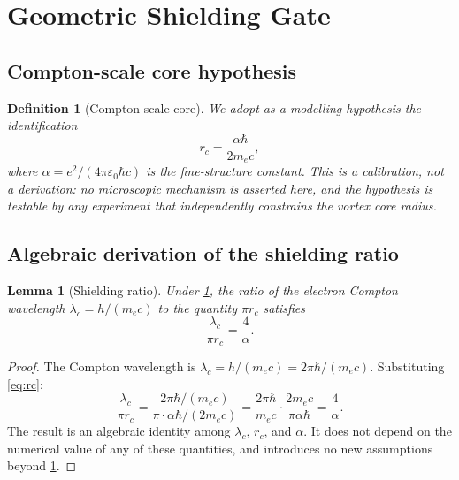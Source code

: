 \documentclass[11pt, a4paper]{article}
\newtheorem{definition}{Definition}
\newtheorem{lemma}{Lemma}
\newcommand{\rc}{r_c}        %
\newcommand{\lc}{\lambda_c}  %
\begin{document}
\section{Geometric Shielding Gate}
\label{sec:geometric}

\subsection{Compton-scale core hypothesis}
\label{sec:core_hypothesis}

\begin{definition}[Compton-scale core]
\label{def:core}
We adopt as a modelling hypothesis the identification
\begin{equation}
  \rc = \frac{\alpha\hbar}{2m_e c},
  \label{eq:rc}
\end{equation}
where $\alpha = e^2/(4\pi\varepsilon_0\hbar c)$ is the
fine-structure constant.
This is a \emph{calibration}, not a derivation: no microscopic
mechanism is asserted here, and the hypothesis is testable by
any experiment that independently constrains the vortex core
radius.
\end{definition}

\subsection{Algebraic derivation of the shielding ratio}
\label{sec:4alpha}

\begin{lemma}[Shielding ratio]
\label{lem:shield}
Under \cref{def:core}, the ratio of the electron Compton
wavelength $\lc = h/(m_e c)$ to the quantity $\pi\rc$ satisfies
\begin{equation}
  \frac{\lc}{\pi\rc} = \frac{4}{\alpha}.
  \label{eq:shielding}
\end{equation}
\end{lemma}

\begin{proof}
The Compton wavelength is $\lc = h/(m_e c) = 2\pi\hbar/(m_e c)$.
Substituting \cref{eq:rc}:
\begin{equation}
  \frac{\lc}{\pi\rc}
  = \frac{2\pi\hbar/(m_e c)}{\pi \cdot \alpha\hbar/(2m_e c)}
  = \frac{2\pi\hbar}{m_e c}\cdot\frac{2m_e c}{\pi\alpha\hbar}
  = \frac{4}{\alpha}.
\end{equation}
The result is an algebraic identity among $\lc$, $\rc$, and
$\alpha$.
It does not depend on the numerical value of any of these
quantities, and introduces no new assumptions beyond
\cref{def:core}.
\end{proof}
\end{document}
